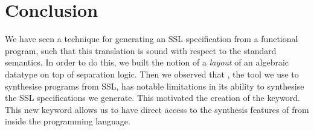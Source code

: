 \section{Conclusion}
\label{sec:conclusion}

We have seen a technique for generating an SSL specification from a functional program, such that this translation is sound with respect to the standard semantics. In order to do this, we built the notion of a \textit{layout} of an algebraic datatype on top of separation logic. Then we observed that \SuSLik, the tool we use to synthesise programs from SSL, has notable limitations in its ability to synthesise the SSL specifications we generate. This motivated the creation of the \synth{} keyword. This new keyword allows us to have direct access to the synthesis features of \SuSLik{} from inside the \Pika{} programming language.

